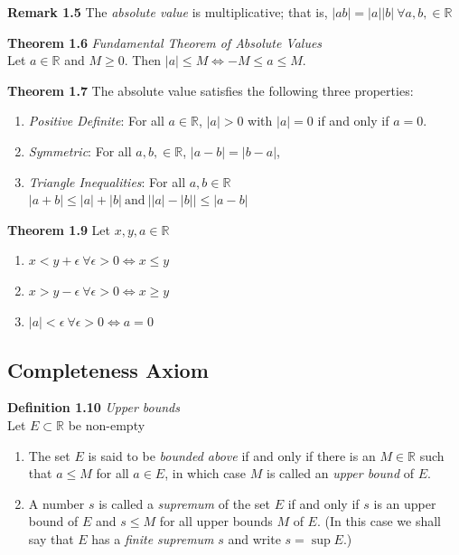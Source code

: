 \documentclass[8pt,landscape]{article}
\begin{document}
\begin{multicols}{3}
    \textbf{Remark 1.5} The \emph{absolute value} is multiplicative;
    that is, $|ab| = |a||b| \ \forall a, b, \in \mathbb{R}$

    \textbf{Theorem 1.6} \emph{Fundamental Theorem of Absolute Values} \\
    Let $a \in \mathbb{R}$ and $M \geq 0$.
    Then $|a| \leq M \iff -M \leq a \leq M$.

    \textbf{Theorem 1.7} The absolute value satisfies the following three properties:
    \begin{enumerate}
        \item \emph{Positive Definite}:
            For all $a \in \mathbb{R}$, $|a| > 0$ with $|a| = 0$ if and only if $a = 0$.
        \item \emph{Symmetric}:
            For all $a, b, \in \mathbb{R}$, $|a - b| = |b - a|$,
        \item \emph{Triangle Inequalities}:
            For all $a, b \in \mathbb{R}$ \\
            $|a + b| \leq |a| + |b| \ \text{and} \
            \left| |a| - |b| \right| \leq |a - b|$
    \end{enumerate}

    \textbf{Theorem 1.9} Let $x, y, a \in \mathbb{R}$
    \begin{enumerate}
        \item $x < y + \epsilon \ \forall \epsilon > 0 \iff x \leq y$
        \item $x > y - \epsilon \ \forall \epsilon > 0 \iff x \geq y$
        \item $|a| < \epsilon \ \forall \epsilon > 0 \iff a = 0$
    \end{enumerate}


    \subsection{Completeness Axiom}



    \textbf{Definition 1.10} \emph{Upper bounds} \\
    Let $E \subset \mathbb{R}$ be non-empty
    \begin{enumerate}
        \item The set $E$ is said to be \emph{bounded above} if and only if there is an
            $M \in \mathbb{R}$ such that $a \leq M$ for all $a \in E$,
            in which case $M$ is called an \emph{upper bound} of $E$.
        \item A number $s$ is called a \emph{supremum} of the set $E$ if and only if $s$
            is an upper bound of $E$ and $s \leq M$ for all upper bounds $M$ of $E$.
            (In this case we shall say that $E$ has a \emph{finite supremum} $s$ and write
            $s = \sup E$.)
    \end{enumerate}


\end{multicols}
\end{document}

